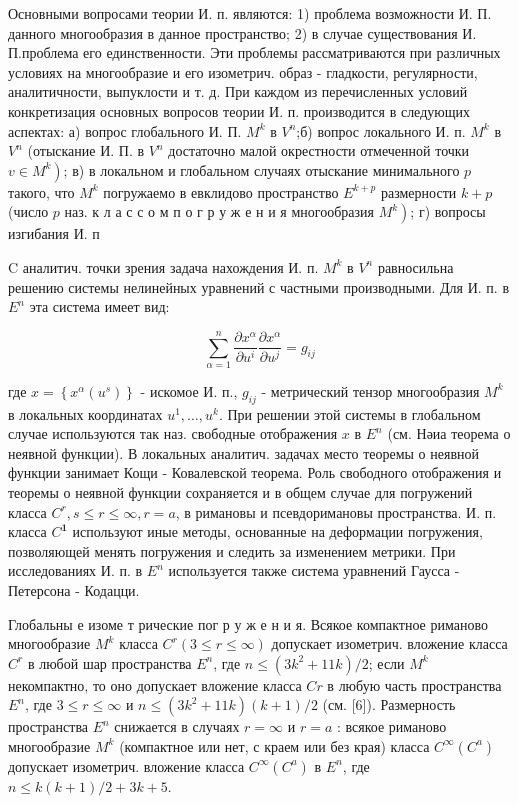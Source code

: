 \documentclass[10pt]{article}
\begin{document}
Основными вопросами теории И. п. являются: 1) проблема возможности И. П. данного многообразия в данное пространство; 2) в случае существования И. П.проблема его единственности. Эти проблемы рассматриваются при различных условиях на многообразие и его изометрич. образ - гладкости, регулярности, аналитичности, выпуклости и т. д. При каждом из перечисленных условий конкретизация основных вопросов теории И. п. производится в следующих аспектах: а) вопрос глобального И. П. $M^{k}$ в $V^{n}$;б) вопрос локального И. п. $M^{k}$ в $V^{n}$ (отыскание И. П. в $V^{n}$ достаточно малой окрестности отмеченной точки $\left.v \in M^{k}\right)$; в) в локальном и глобальном случаях отыскание минимального $p$ такого, что $M^{k}$ погружаемо в евклидово пространство $E^{k+p}$ размерности $k+p$ (число $p$ наз. к л а с с о м п о г р у ж е н и я многообразия $\left.M^{k}\right)$; г) вопросы изгибания И. п



C аналитич. точки зрения задача нахождения И. п. $M^{k}$ в $V^{n}$ равносильна решению системы нелинейных уравнений с частными производными. Для И. п. в $E^{n}$ эта система имеет вид:



\[

\sum_{\alpha=1}^{n} \frac{\partial x^{\alpha}}{\partial u^{i}} \frac{\partial x^{\alpha}}{\partial u^{j}}=g_{i j}

\]



где $x=\left\{x^{\alpha}\left(u^{s}\right)\right\}$ - искомое И. п., $g_{i j}$ - метрический тензор многообразия $M^{k}$ в локальных координатах $u^{1}, \ldots, u^{k}$. При решении этой системы в глобальном случае используются так наз. свободные отображения $x$ в $E^{n}$ (см. Нәиа теорема о неявной функции). В локальных аналитич. задачах место теоремы о неявной функции занимает Кощи - Ковалевской теорема. Роль свободного отображения и теоремы о неявной функции сохраняется и в общем случае для погружений класса $C^{r}, s \leqslant r \leqslant \infty, r=a$, в римановы и псевдоримановы пространства. И. п. класса $C^{\mathbf{1}}$ используют иные методы, основанные на деформации погружения, позволяющей менять погружения и следить за изменением метрики. При исследованиях И. п. в $E^{n}$ используется также система уравнений Гаусса - Петерсона - Кодацци.



Глобальны е изоме т рические пог р у ж е н и я. Всякое компактное риманово многообразие $M^{k}$ класса $C^{r}(3 \leqslant r \leqslant \infty)$ допускает изометрич. вложение класса $C^{r}$ в любой шар пространства $E^{n}$, где $n \leqslant\left(3 k^{2}+11 k\right) / 2$; если $M^{k}$ некомпактно, то оно допускает вложение класса $C r$ в любую часть пространства $E^{n}$, где $3 \leqslant r \leqslant \infty$ и $n \leqslant\left(3 k^{2}+11 k\right)(k+1) / 2$ (см. [6]). Размерность пространства $E^{n}$ снижается в случаях $r=\infty$ и $r=a$ : всякое риманово многообразие $M^{k}$ (компактное или нет, с краем или без края) класса $C^{\infty}\left(C^{a}\right)$ допускает изометрич. вложение класса $C^{\infty}\left(C^{a}\right)$ в $E^{n}$, где $n \leqslant k(k+1) / 2+3 k+5$.
\end{document}
